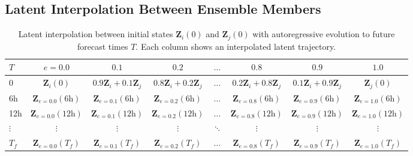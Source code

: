 \documentclass{agujournal2019}
\begin{document}

\subsection{Latent Interpolation Between Ensemble Members}

\begin{table}[h!]
\centering
\small
\begin{tabular}{lccccccc}
\toprule
\textbf{$T$} & $e{=}0.0$ & $0.1$ & $0.2$ & $\dots$ & $0.8$ & $0.9$ & $1.0$ \\
\midrule
0 & $\mathbf{Z}_i(0)$ & $0.9\mathbf{Z}_i{+}0.1\mathbf{Z}_j$ & $0.8\mathbf{Z}_i{+}0.2\mathbf{Z}_j$ & $\dots$ & $0.2\mathbf{Z}_i{+}0.8\mathbf{Z}_j$ & $0.1\mathbf{Z}_i{+}0.9\mathbf{Z}_j$ & $\mathbf{Z}_j(0)$ \\
6h & $\mathbf{Z}_{e=0.0}(6\text{h})$ & $\mathbf{Z}_{e=0.1}(6\text{h})$ & $\mathbf{Z}_{e=0.2}(6\text{h})$ & $\dots$ & $\mathbf{Z}_{e=0.8}(6\text{h})$ & $\mathbf{Z}_{e=0.9}(6\text{h})$ & $\mathbf{Z}_{e=1.0}(6\text{h})$ \\
12h & $\mathbf{Z}_{e=0.0}(12\text{h})$ & $\mathbf{Z}_{e=0.1}(12\text{h})$ & $\mathbf{Z}_{e=0.2}(12\text{h})$ & $\dots$ & $\mathbf{Z}_{e=0.8}(12\text{h})$ & $\mathbf{Z}_{e=0.9}(12\text{h})$ & $\mathbf{Z}_{e=1.0}(12\text{h})$ \\
$\vdots$ & $\vdots$ & $\vdots$ & $\vdots$ & $\ddots$ & $\vdots$ & $\vdots$ & $\vdots$ \\
$T_f$ & $\mathbf{Z}_{e=0.0}(T_f)$ & $\mathbf{Z}_{e=0.1}(T_f)$ & $\mathbf{Z}_{e=0.2}(T_f)$ & $\dots$ & $\mathbf{Z}_{e=0.8}(T_f)$ & $\mathbf{Z}_{e=0.9}(T_f)$ & $\mathbf{Z}_{e=1.0}(T_f)$ \\
\bottomrule
\end{tabular}
\caption{Latent interpolation between initial states $\mathbf{Z}_i(0)$ and $\mathbf{Z}_j(0)$ with autoregressive evolution to future forecast times $T$. Each column shows an interpolated latent trajectory.}
\label{tab:latent_interp}
\end{table}
\end{document}
